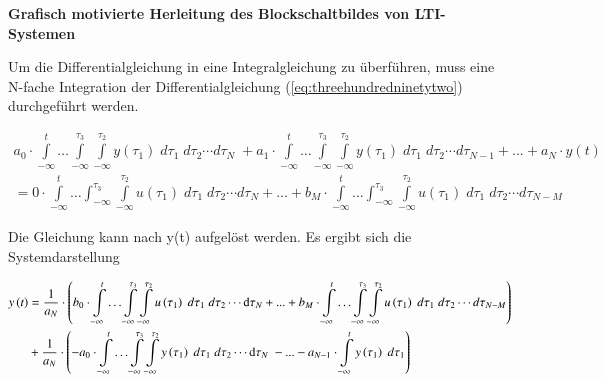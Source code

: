 {\selectfont
\noindent\textbf{Grafisch motivierte Herleitung des Blockschaltbildes von LTI-Systemen }}

\noindent Um die Differentialgleichung in eine Integralgleichung zu überführen, muss eine N-fache Integration der Differentialgleichung (\ref{eq:threehundredninetytwo}) durchgeführt werden. 

\begin{equation}\label{eq:threehundredninetythree}
\begin{split}
a_{0} \cdot \int\limits _{-\infty }^{t}\ldots \int\limits _{-\infty }^{\tau _{3}}\int\limits _{-\infty }^{\tau _{2} }y\left(\tau _{1} \right) \; d\tau _{1}  \; d\tau _{2} \cdots d\tau _{N}  \; +a_{1} \cdot \int\limits _{-\infty }^{t}\ldots \int\limits _{-\infty }^{\tau _{3} }\int\limits _{-\infty }^{\tau _{2} }y\left(\tau _{1} \right) \; d\tau _{1}  \; d\tau _{2} \cdots d\tau _{N-1}  +...+a_{N} \cdot y\left(t\right)\\
= 0 \cdot \int\limits _{-\infty }^{t}\ldots \int _{-\infty }^{\tau _{3} }\int\limits _{-\infty }^{\tau _{2} }u\left(\tau _{1} \right) \; d\tau _{1}  \; d \tau _{2} \cdots d\tau _{N}  +...+b_{M} \cdot \int\limits _{-\infty }^{t}\ldots \int _{-\infty }^{\tau _{3} }\int\limits _{-\infty }^{\tau _{2} }u\left(\tau _{1} \right) \; d\tau _{1}  \;d\tau _{2} \cdots d\tau _{N-M}
\end{split}
\end{equation}

\noindent Die Gleichung kann nach y(t) aufgelöst werden. Es ergibt sich die Systemdarstellung 

\begin{equation}\label{eq:threehundredninetyfour}
\begin{split}
y\left(t\right) & = \frac{1}{a_{N} } \cdot \left(b_{0} \cdot \int\limits _{-\infty }^{t}\ldots \int\limits _{-\infty }^{\tau _{3} }\int\limits _{-\infty }^{\tau _{2} }u\left(\tau _{1} \right) \; d\tau _{1}  \; d\tau _{2} \cdots {\rm d}\tau _{N}  +...+b_{M} \cdot \int\limits _{-\infty }^{t}\ldots \int\limits _{-\infty }^{\tau _{3} }\int\limits _{-\infty }^{\tau _{2} }u\left(\tau _{1} \right) \; d\tau _{1}  \; d\tau _{2} \cdots d\tau _{N-M}  \right) \\ 
& +\frac{1}{a_{N} } \cdot \left(-a_{0} \cdot \int\limits _{-\infty }^{t}\ldots \int\limits _{-\infty }^{\tau _{3} }\int\limits _{-\infty }^{\tau _{2} }y\left(\tau _{1} \right) \; d\tau _{1}  \; d\tau _{2} \cdots {\rm d}\tau _{N}  \;-...-a_{N-1} \cdot \int\limits _{-\infty }^{t}y\left(\tau _{1} \right) \; d\tau _{1} \right)
\end{split}
\end{equation}


